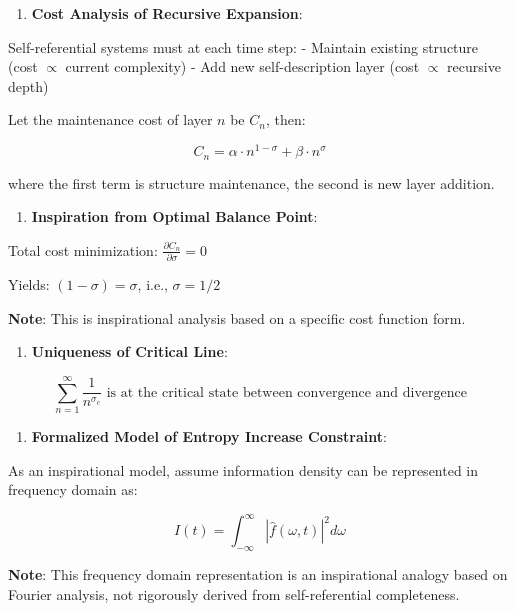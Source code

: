 \begin{enumerate}
\item \textbf{Cost Analysis of Recursive Expansion}:
\end{enumerate}
   Self-referential systems must at each time step:
   - Maintain existing structure (cost $\propto$ current complexity)
   - Add new self-description layer (cost $\propto$ recursive depth)
   
   Let the maintenance cost of layer $n$ be $C_n$, then:
   
\begin{equation}
C_n = \alpha \cdot n^{1-\sigma} + \beta \cdot n^{\sigma}
\end{equation}
   
   where the first term is structure maintenance, the second is new layer addition.

\begin{enumerate}
\item \textbf{Inspiration from Optimal Balance Point}:
\end{enumerate}
   Total cost minimization: $\frac{\partial C_n}{\partial \sigma} = 0$
   
   Yields: $(1-\sigma) = \sigma$, i.e., $\sigma = 1/2$
   
   \textbf{Note}: This is inspirational analysis based on a specific cost function form.

\begin{enumerate}
\item \textbf{Uniqueness of Critical Line}:
\end{enumerate}
   
\begin{equation}
\sum_{n=1}^{\infty} \frac{1}{n^{\sigma_c}} \text{ is at the critical state between convergence and divergence}
\end{equation}

\begin{enumerate}
\item \textbf{Formalized Model of Entropy Increase Constraint}:
\end{enumerate}
   As an inspirational model, assume information density can be represented in frequency domain as:
   
\begin{equation}
I(t) = \int_{-\infty}^{\infty} |\hat{f}(\omega,t)|^2 d\omega
\end{equation}
   
   \textbf{Note}: This frequency domain representation is an inspirational analogy based on Fourier analysis, not rigorously derived from self-referential completeness.
   

